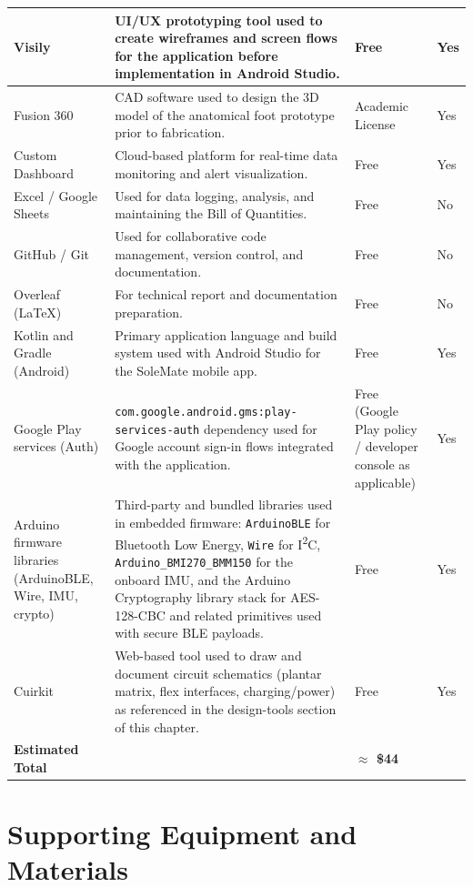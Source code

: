 \begin{longtable}{|>{\raggedright\arraybackslash}p{2.85cm}|>{\raggedright\arraybackslash}p{8.55cm}|>{\raggedright\arraybackslash}p{1.95cm}|>{\centering\arraybackslash}p{1.25cm}|}
Visily & UI/UX prototyping tool used to create wireframes and screen flows for the application before implementation in Android Studio. & Free & Yes \\ \hline
Fusion 360 & CAD software used to design the 3D model of the anatomical foot prototype prior to fabrication. & Academic License & Yes \\ \hline
Custom Dashboard & Cloud-based platform for real-time data monitoring and alert visualization. & Free & Yes \\ \hline
Excel / Google Sheets & Used for data logging, analysis, and maintaining the Bill of Quantities. & Free & No \\ \hline
GitHub / Git & Used for collaborative code management, version control, and documentation. & Free & No \\ \hline
Overleaf (LaTeX) & For technical report and documentation preparation. & Free & No \\ \hline
Kotlin and Gradle (Android) & Primary application language and build system used with Android Studio for the SoleMate mobile app. & Free & Yes \\ \hline
Google Play services (Auth) & \texttt{com.google.android.gms:play-services-auth} dependency used for Google account sign-in flows integrated with the application. & Free (Google Play policy / developer console as applicable) & Yes \\ \hline
Arduino firmware libraries (ArduinoBLE, Wire, IMU, crypto) & Third-party and bundled libraries used in embedded firmware: \texttt{ArduinoBLE} for Bluetooth Low Energy, \texttt{Wire} for I\textsuperscript{2}C, \texttt{Arduino\_BMI270\_BMM150} for the onboard IMU, and the Arduino Cryptography library stack for AES-128-CBC and related primitives used with secure BLE payloads. & Free & Yes \\ \hline
Cuirkit & Web-based tool used to draw and document circuit schematics (plantar matrix, flex interfaces, charging/power) as referenced in the design-tools section of this chapter. & Free & Yes \\ \hline
\textbf{Estimated Total} & & \textbf{$\approx$ \$44} & \\
\hline
\end{longtable}
\endgroup

\section{Supporting Equipment and Materials}

